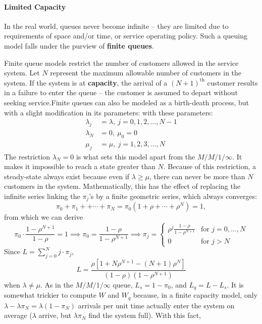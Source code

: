 \paragraph{Limited Capacity}
In the real world, queues never become infinite -- they are limited due to requirements of {space} and/or {time}, or service operating policy. Such a queuing model falls under the purview of \textbf{finite queues}. \par Finite queue models restrict the number of customers allowed in the service system. Let $N$ represent the maximum allowable number of customers in the system. If the system is at \textbf{capacity}, the arrival of a $(N+1)^{\textrm{th}}$ customer results in a failure to enter the queue -- the customer is assumed to depart without seeking service.\newl Finite queues can also be modeled as a birth-death process, but with a slight modification in its parameters:  with these parameters:
\begin{align*}
\lambda_{j} &= \lambda, \ j=0,1,2,\ldots,N-1 \\ 
\lambda_{N} &= 0,\ \mu_{0} = 0 \\
\mu_{j} &= \mu,\  j=1,2,3,\ldots, N 
\end{align*}
The restriction $\lambda_{N} = 0$ is what sets this model apart from the $M/M/1/\infty$. It makes it impossible to reach a state greater than $N$. Because of this restriction, a steady-state always exist because even if $\lambda \geq \mu$, there can never be more than $N$ customers in the system.
\newl Mathematically, this has the effect of replacing the infinite series linking the $\pi_j$'s by a finite geometric series, which always converges: 
$$ \pi_{0}+\pi_1 + +\cdots + \pi_N = \pi_0(1+\rho+\cdots +\rho^{N}) = 1,$$ from which we can derive $$\pi_{0}\cdot \frac{1-\rho^{N+1}}{1-\rho} = 1 \implies \pi_0 = \frac{1-\rho}{1-\rho^{N+1}} \implies \pi_{j} = \begin{cases}\rho^{j} \frac{1-\rho}{1-\rho^{N+1}} & \text{for $j=0,\ldots,N$} \\ 0 & \text{for $j>N$}\end{cases}$$ 
Since $L = \sum^{N}_{j=0} j\cdot \pi_{j}$, 
$$L = \frac{\rho [1+ N \rho^{N+1} - (N+1) \rho^{N} ]}{(1-\rho)\left(1-\rho^{N+1}\right)} $$
when $\lambda\neq\mu$. \newl As in the $M/M/1/\infty$ queue, $L_{s} = 1 - \pi_{0}$, and $L_{q} = L - L_{s}$.  It is somewhat trickier to compute $W$ and $W_{q}$ because, in a finite capacity model, only $\lambda - \lambda \pi_{N} = \lambda\left(1-\pi_{N}\right)$ arrivals per unit time  actually enter the system on average ($\lambda$ arrive, but $\lambda\pi_N$ find the system full). With this fact, 
